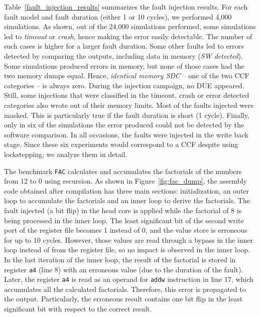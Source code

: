Table~\ref{fault_injection_results} summarizes the fault injection results. For each fault model and fault duration (either 1 or 10 cycles), we performed 4,000 simulations. 
As shown, out of the 24,000 simulations performed, some simulations led to \emph{timeout} or \emph{crash}, hence making the error easily detectable. The number of such cases is higher for a larger fault duration. Some other faults led to errors detected by comparing the outputs, including data in memory (\emph{SW detected}). 
Some simulations produced errors in memory, but none of those cases had the two memory dumps equal. Hence, \emph{identical memory SDC} -- one of the two CCF categories -- is always zero.
During the injection campaign, no DUE appeared. Still, some injections that were classified in the timeout, crash or error detected categories also wrote out of their memory limits. 
Most of the faults injected were masked. This is particularly true if the fault duration is short (1 cycle).
Finally, only in six of the simulations the error produced could not be detected by the software comparison. In all occasions, the faults were injected in the write back stage. Since these six experiments would correspond to a CCF despite using lockstepping, we analyze them in detail.

The benchmark \texttt{FAC} calculates and accumulates the factorials of the numbers from 12 to 0 using recursion. As shown in Figure~\ref{fig:fac_dump}, the assembly code obtained after compilation has three main sections: initialization, an outer loop to accumulate the factorials and an inner loop to derive the factorials. 
The fault injected (a bit flip) in the head core is applied while the factorial of 8 is being processed in the inner loop. The least significant bit of the second write port of the register file becomes 1 instead of 0, and the value store is erroneous for up to 10 cycles. 
However, those values are read through a bypass in the inner loop instead of from the register file, so no impact is observed in the inner loop. 
In the last iteration of the inner loop, the result of the factorial is stored in register \texttt{a4} (line 8) with an erroneous value (due to the duration of the fault). Later, the register \texttt{a4} is read as an operand for \texttt{addw} instruction in line 17, which accumulates all the calculated factorials. Therefore, this error is propagated to the output. Particularly, the erroneous result contains one bit flip in the least significant bit with respect to the correct result.

